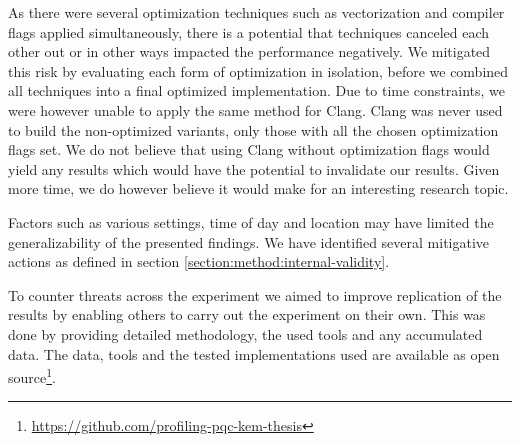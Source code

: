 As there were several optimization techniques such as vectorization and compiler flags applied simultaneously, there is a potential that techniques canceled each other out or in other ways impacted the performance negatively. We mitigated this risk by evaluating each form of optimization in isolation, before we combined all techniques into a final optimized implementation. Due to time constraints, we were however unable to apply the same method for Clang. Clang was never used to build the non-optimized variants, only those with all the chosen optimization flags set. We do not believe that using Clang without optimization flags would yield any results which would have the potential to invalidate our results. Given more time, we do however believe it would make for an interesting research topic.

Factors such as various settings, time of day and location may have limited the generalizability of the presented findings. We have identified several mitigative actions as defined in section \ref{section:method:internal-validity}.

To counter threats across the experiment we aimed to improve replication of the results by enabling others to carry out the experiment on their own. This was done by providing detailed methodology, the used tools and any accumulated data. The data, tools and the tested implementations used are available as open source\footnote{\url{https://github.com/profiling-pqc-kem-thesis}}.

\iffalse
\todo[inline]{
Vi behövde köra om micro en jäkla massa gånger - främst på gammal / "low-end" hårdvara. Low-end-laptop fick inte komplett data trots många omkörningar.
}

\todo[inline]{
only a single run of callgrind on mceliece and ntru's tests. mceliece is non-deterministic and may behave weird in a single run.
}

\todo[inline]{Validity: vänd på körschemat när man kör så att inte NTRU får köras på natten varje gång - utan att sådana saker slås ut.}

\todo[inline]{Svårt att mäta på IBM och i molnet?}

\todo[inline]{diskutera hur benchmarks inte säkerställer att rätt svar ges från algoritmerna. Detta utelämnas p.g.a. prestanda / träffsäkerhet i mätningar. Vi löser det genom att ha tester som är samma kod som benchmarken, fast med validering}

\todo[inline]{
-- Dedicated hardware for mainframes may behave differently
}

\todo[inline]{Swap locks the system while writing/reading to from disk}

\todo[inline]{We have only selected a subset of potential optimizations?}
\fi